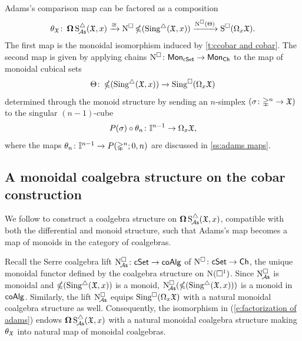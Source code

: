 Adams's comparison map can be factored as a composition
\begin{equation}\label{e:factorization of adams}
	\theta_\fX \colon \cobar \sSchainsA(\fX,x) \xrightarrow{\cong}
	\cchains \ccobar(\sSing(\fX,x)) \xrightarrow{\cchains(\Theta)}
	\cSchains(\loops_x \fX).
\end{equation}
The first map is the monoidal isomorphism induced by \cref{t:ccobar and cobar}.
The second map is given by applying chains $\cchains \colon \Mon_{\cSet} \to \Mon_{\Ch}$ to the map of monoidal cubical sets
\[
\Theta \colon \ccobar(\sSing(\fX,x)) \to \cSing(\loops_x \fX)
\]
determined through the monoid structure by sending an $n$-simplex $(\sigma \colon \gsimplex^n \to \fX)$ to the singular $(n-1)$-cube
\[
P(\sigma) \circ \theta_n \colon \gcube^{n-1} \to \loops_x \fX,
\]
where the maps $\theta_n \colon \gcube^{n-1} \to P(\gsimplex^n;0,n)$ are discussed in \cref{ss:adams maps}.

\subsection{A monoidal coalgebra structure on the cobar construction}

We follow \cite{baues1998hopf} to construct a coalgebra structure on $\cobar \sSchainsA(\fX,x)$, compatible with both the differential and monoid structure, such that Adams's map becomes a map of monoids in the category of coalgebras.

Recall the Serre coalgebra lift $\cchainsA \colon \cSet \to \coAlg$ of $\cchains \colon \cSet \to \Ch$, the unique monoidal functor defined by the coalgebra structure on $\chains(\cube^1)$.
Since $\cchainsA$ is monoidal and $\ccobar(\sSing(\fX,x))$ is a monoid, $\cchainsA(\ccobar(\sSing(\fX,x)))$ is a monoid in $\coAlg$.
Similarly, the lift $\cchainsA$ equips $\cSing(\loops_x \fX)$ with a natural monoidal coalgebra structure as well.
Consequently, the isomorphism in (\ref{e:factorization of adams}) endows $\cobar \sSchainsA(\fX,x)$ with a natural monoidal coalgebra structure making $\theta_\fX$ into natural map of monoidal coalgebras.